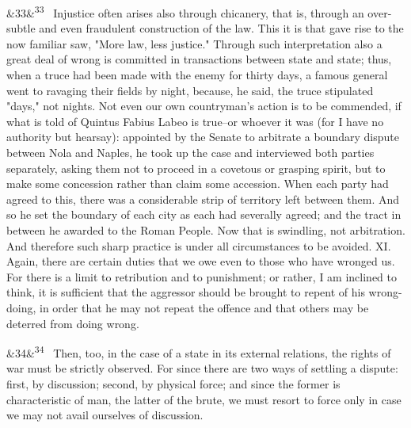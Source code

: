 \documentclass[12pt]{article}
\newcommand{\para}[1][]{\par\noindent\ifx&#1&\else\textsuperscript{\footnotesize #1}~\fi}
\begin{document}
\para[33] Injustice often arises also through chicanery, that is, through an over-subtle and even fraudulent construction of the law. This it is that gave rise to the now familiar saw, "More law, less justice." Through such interpretation also a great deal of wrong is committed in transactions between state and state; thus, when a truce had been made with the enemy for thirty days, a famous general went to ravaging their fields by night, because, he said, the truce stipulated "days," not nights. Not even our own countryman's action is to be commended, if what is told of Quintus Fabius Labeo is true--or whoever it was (for I have no authority but hearsay): appointed by the Senate to arbitrate a boundary dispute between Nola and Naples, he took up the case and interviewed both parties separately, asking them not to proceed in a covetous or grasping spirit, but to make some concession rather than claim some accession. When each party had agreed to this, there was a considerable strip of territory left between them. And so he set the boundary of each city as each had severally agreed; and the tract in between he awarded to the Roman People. Now that is swindling, not arbitration. And therefore such sharp practice is under all circumstances to be avoided. XI. Again, there are certain duties that we owe even to those who have wronged us. For there is a limit to retribution and to punishment; or rather, I am inclined to think, it is sufficient that the aggressor should be brought to repent of his wrong-doing, in order that he may not repeat the offence and that others may be deterred from doing wrong.

\para[34] Then, too, in the case of a state in its external relations, the rights of war must be strictly observed. For since there are two ways of settling a dispute: first, by discussion; second, by physical force; and since the former is characteristic of man, the latter of the brute, we must resort to force only in case we may not avail ourselves of discussion.
\end{document}
